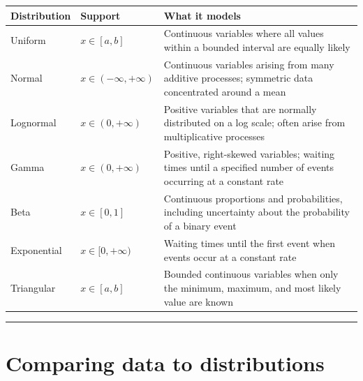 \documentclass[
  13,
  letterpaper,
]{report}
\begin{document}
\begin{longtable}[]{@{}
  >{\raggedright\arraybackslash}p{}
  >{\raggedright\arraybackslash}p{}
  >{\raggedright\arraybackslash}p{}@{}}
\toprule\noalign{}
\begin{minipage}[b]{\linewidth}\raggedright
Distribution
\end{minipage} & \begin{minipage}[b]{\linewidth}\raggedright
Support
\end{minipage} & \begin{minipage}[b]{\linewidth}\raggedright
What it models
\end{minipage} \\
\midrule\noalign{}
\endhead
\bottomrule\noalign{}
\endlastfoot
Uniform & \(x\in[a,b]\) & Continuous variables where all values within a
bounded interval are equally likely \\
Normal & \(x\in(-\infty,+\infty)\) & Continuous variables arising from
many additive processes; symmetric data concentrated around a mean \\
Lognormal & \(x\in(0,+\infty)\) & Positive variables that are normally
distributed on a log scale; often arise from multiplicative processes \\
Gamma & \(x\in(0,+\infty)\) & Positive, right-skewed variables; waiting
times until a specified number of events occurring at a constant rate \\
Beta & \(x\in[0,1]\) & Continuous proportions and probabilities,
including uncertainty about the probability of a binary event \\
Exponential & \(x\in[0,+\infty)\) & Waiting times until the first event
when events occur at a constant rate \\
Triangular & \(x\in[a,b]\) & Bounded continuous variables when only the
minimum, maximum, and most likely value are known \\
\end{longtable}

\begin{center}\rule{0.5\linewidth}{0.5pt}\end{center}

\chapter{Comparing data to distributions}\label{sec-dtest}
\end{document}
